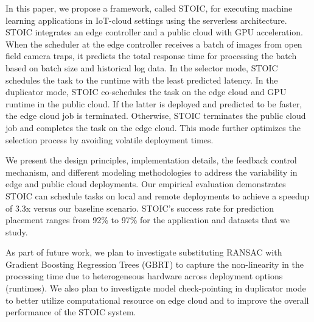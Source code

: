In this paper, we propose a framework, called STOIC, for executing machine learning applications in IoT-cloud settings using the serverless architecture. STO\-IC integrates an edge controller and a public cloud with GPU acceleration. When the scheduler at the edge controller receives a batch of images from open field camera traps, it predicts the total response time for processing the batch based on batch size and historical log data. In the selector mode, STOIC schedules the task to the runtime with the least predicted latency. In the duplicator mode, STOIC co-schedules the task on the edge cloud and GPU runtime in the public cloud. If the latter is deployed and predicted to be faster, the edge cloud job is terminated. Otherwise, STOIC terminates the public cloud job and completes the task on the edge cloud. This mode further optimizes the selection process by avoiding volatile deployment times.

We present the design principles, implementation details, the feedback control mechanism, and different modeling methodologies to address the variability in edge and public cloud deployments. Our empirical evaluation demonstrates STOIC can schedule tasks on local and remote deployments to achieve a speedup of 3.3x versus our baseline scenario. STOIC's success rate for prediction placement  ranges from 92\% to 97\% for the application and datasets that we study. 

As part of future work, we plan to investigate substituting RANSAC with Gradient Boosting Regression Trees (GBRT) to capture the non-linearity in the processing time due to heterogeneous hardware across deployment options (runtimes). We also plan to investigate model check-pointing in duplicator mode to better utilize computational resource on edge cloud and to improve the overall performance of the STOIC system.
